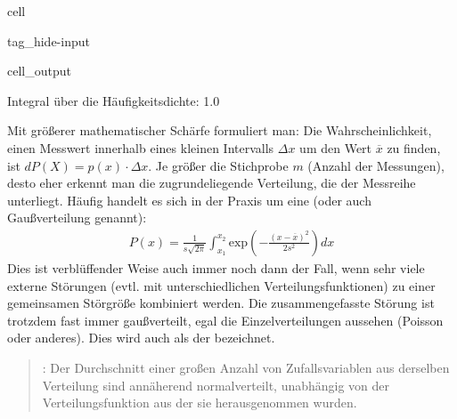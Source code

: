 \documentclass[letterpaper,10pt,english]{jupyterBook}
\begin{document}
\begin{sphinxuseclass}{cell}
\begin{sphinxuseclass}{tag_hide-input}\begin{sphinxVerbatimOutput}

\begin{sphinxuseclass}{cell_output}
\noindent{}

\begin{sphinxVerbatim}[commandchars=\\\{\}]
Integral über die Häufigkeitsdichte:  1.0
\end{sphinxVerbatim}

\end{sphinxuseclass}\end{sphinxVerbatimOutput}

\end{sphinxuseclass}
\end{sphinxuseclass}
\sphinxAtStartPar
Mit größerer mathematischer Schärfe formuliert man: Die Wahrscheinlichkeit, einen Messwert innerhalb eines kleinen Intervalls \(\Delta x\) um den Wert \(\overline x\) zu finden, ist \(dP(X) = p(x)\cdot \Delta x\). Je größer die Stichprobe \(m\) (Anzahl der Messungen), desto eher erkennt man die zugrundeliegende Verteilung, die der Messreihe unterliegt. Häufig handelt es sich in der Praxis um eine  (oder auch Gaußverteilung genannt):
\begin{equation*}
\begin{split}P(x) = \frac{1}{s \sqrt{2\pi}}\int_{x_1}^{x_2} \mathrm{exp}\left(-\frac{(x-\overline x)^2}{2s^2}\right) dx\end{split}
\end{equation*}
\sphinxAtStartPar
Dies ist verblüffender Weise auch immer noch dann der Fall, wenn sehr viele externe Störungen (evtl. mit unterschiedlichen Verteilungsfunktionen) zu einer gemeinsamen Störgröße kombiniert werden. Die zusammengefasste Störung ist trotzdem fast immer gaußverteilt, egal die Einzelverteilungen aussehen (Poisson oder anderes). Dies wird auch als der  bezeichnet.
\begin{quote}

\sphinxAtStartPar
{}: Der Durchschnitt einer großen Anzahl von Zufallsvariablen aus derselben Verteilung sind annäherend normalverteilt, unabhängig von der Verteilungsfunktion aus der sie herausgenommen wurden.
\end{quote}
\end{document}

